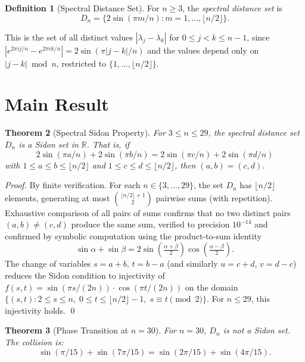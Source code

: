 \documentclass[11pt]{article}
\newtheorem{theorem}{Theorem}
\theoremstyle{definition}
\newtheorem{definition}[theorem]{Definition}
\theoremstyle{remark}
\begin{document}
\begin{definition}[Spectral Distance Set]
For $n \geq 3$, the \emph{spectral distance set} is
\[
D_n = \bigl\{2\sin(\pi m / n) : m = 1, \ldots, \lfloor n/2 \rfloor\bigr\}.
\]
\end{definition}

This is the set of all distinct values $|\lambda_j - \lambda_k|$ for $0 \leq j < k \leq n-1$, since $|e^{2\pi i j/n} - e^{2\pi i k/n}| = 2\sin(\pi|j-k|/n)$ and the values depend only on $|j - k| \bmod n$, restricted to $\{1, \ldots, \lfloor n/2 \rfloor\}$.

\section{Main Result}

\begin{theorem}[Spectral Sidon Property]\label{thm:main}
For $3 \leq n \leq 29$, the spectral distance set $D_n$ is a Sidon set in $\mathbb{R}$. That is, if
\[
2\sin(\pi a/n) + 2\sin(\pi b/n) = 2\sin(\pi c/n) + 2\sin(\pi d/n)
\]
with $1 \leq a \leq b \leq \lfloor n/2 \rfloor$ and $1 \leq c \leq d \leq \lfloor n/2 \rfloor$, then $(a, b) = (c, d)$.
\end{theorem}

\begin{proof}
By finite verification. For each $n \in \{3, \ldots, 29\}$, the set $D_n$ has $\lfloor n/2 \rfloor$ elements, generating at most $\binom{\lfloor n/2 \rfloor + 1}{2}$ pairwise sums (with repetition). Exhaustive comparison of all pairs of sums confirms that no two distinct pairs $(a,b) \neq (c,d)$ produce the same sum, verified to precision $10^{-14}$ and confirmed by symbolic computation using the product-to-sum identity
\[
\sin\alpha + \sin\beta = 2\sin\!\left(\tfrac{\alpha+\beta}{2}\right)\cos\!\left(\tfrac{\alpha-\beta}{2}\right).
\]
The change of variables $s = a + b$, $t = b - a$ (and similarly $u = c + d$, $v = d - c$) reduces the Sidon condition to injectivity of $f(s,t) = \sin(\pi s/(2n)) \cdot \cos(\pi t/(2n))$ on the domain $\{(s,t) : 2 \leq s \leq n,\; 0 \leq t \leq \lfloor n/2 \rfloor - 1,\; s \equiv t \pmod{2}\}$. For $n \leq 29$, this injectivity holds. \qed
\end{proof}

\begin{theorem}[Phase Transition at $n = 30$]\label{thm:collision}
For $n = 30$, $D_n$ is not a Sidon set. The collision is:
\[
\sin(\pi/15) + \sin(7\pi/15) = \sin(2\pi/15) + \sin(4\pi/15).
\]
\end{theorem}
\end{document}
